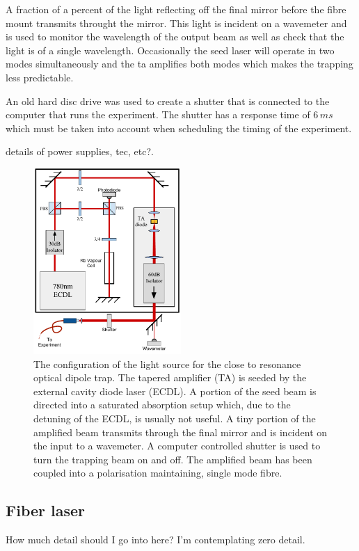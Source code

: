 A fraction of a percent of the light reflecting off the final mirror before the fibre mount transmits throught the mirror. This light is incident on a wavemeter and is used to monitor the wavelength of the output beam as well as check that the light is of a single wavelength. Occasionally the seed laser will operate in two modes simultaneously and the \gls{ta} amplifies both modes which makes the trapping less predictable.

An old hard disc drive was used to create a shutter\cite{scholten_enhanced_2007} that is connected to the computer that runs the experiment. The shutter has a response time of $6\,\unit{ms}$ which must be taken into account when scheduling the timing of the experiment.

{\color{red} details of power supplies, tec, etc?}.

\begin{figure}[h]
\centering
\includegraphics[width=0.5\textwidth]{figs/TAsetup.pdf}
\caption{The configuration of the light source for the close to resonance optical dipole trap. The tapered amplifier (TA) is seeded by the external cavity diode laser (ECDL). A portion of the seed beam is directed into a saturated absorption setup which, due to the detuning of the ECDL, is usually not useful. A tiny portion of the amplified beam transmits through the final mirror and is incident on the input to a wavemeter. A computer controlled shutter is used to turn the trapping beam on and off. The amplified beam has been coupled into a polarisation maintaining, single mode fibre.}
\end{figure}

\subsection{Fiber laser}
{\color{red}How much detail should I go into here? I'm contemplating zero detail.}


